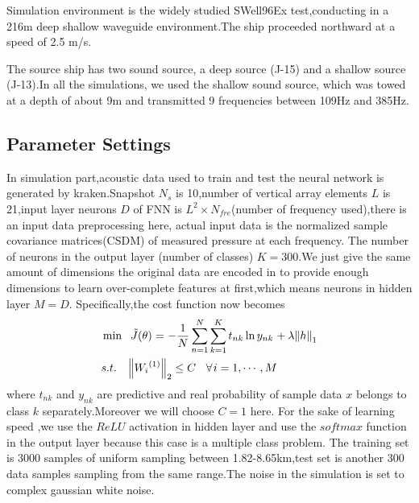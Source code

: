 Simulation environment is the widely studied SWell96Ex test,conducting in a 216m deep shallow waveguide environment.The ship proceeded northward at a speed of 2.5 m/s.

The source ship has two sound source, a deep source (J-15) and a shallow source (J-13).In all the simulations, we used the shallow sound source,
which was towed at a depth of about 9m and transmitted 9 frequencies between 109Hz and 385Hz.

\subsection{Parameter Settings}
In simulation part,acoustic data used to train and test the neural network is generated by kraken.Snapshot $N_{s}$ is 10,number of vertical array elements $L$ is 21,input layer neurons $D$ of FNN is $L^{2} \times N_{fre}$(number of frequency used),there is an input data preprocessing here, actual input data is the normalized sample covariance matrices(CSDM) of measured pressure at each frequency. The number of neurons in the output layer (number of classes) $K = 300$.We just give the same amount of dimensions the original data are encoded in to provide enough dimensions to learn over-complete features at first,which means neurons in hidden layer $M = D$. Specifically,the cost function now becomes
\begin{equation}
\begin{split}
&\min {\kern 1pt} {\kern 1pt} {\kern 1pt} {\kern 1pt} {\kern 1pt} {\kern 1pt} \tilde J(\theta ){\kern 1pt} {\kern 1pt} {\kern 1pt} {\rm{ = }}{\kern 1pt} {\kern 1pt} {\kern 1pt} {\rm{ - }}{{\rm{1}} \over N}\sum\limits_{n = 1}^N {\sum\limits_{k = 1}^K {{t_{nk}}\ln {y_{nk}}{\kern 1pt} {\kern 1pt} {\kern 1pt} {\rm{ + }}{\kern 1pt} {\kern 1pt} \lambda {{\left\| h \right\|}_1}} }\\
& s.t.{\kern 1pt} {\kern 1pt} {\kern 1pt} {\kern 1pt} {\kern 1pt} {\kern 1pt} {\kern 1pt} {\kern 1pt} {\kern 1pt} {\kern 1pt} {\left\| {{W_i}^{(1)}} \right\|_2} \le C{\kern 1pt} {\kern 1pt} {\kern 1pt} {\kern 1pt} {\kern 1pt} {\kern 1pt} {\kern 1pt} {\kern 1pt} {\kern 1pt} \forall {\kern 1pt} i = 1, \cdots ,M\\
\end{split}
\end{equation}
where $t_{nk}$ and $y_{nk}$ are predictive and real probability of sample data $x$ belongs to class $k$ separately.Moreover we will choose $C=1$ here.
For the sake of learning speed ,we use the $ReLU$ activation in hidden layer and use the $softmax$
function in the output layer because this case is a multiple class problem.
The training set is 3000 samples of uniform sampling between 1.82\--8.65km,test set is another 300 data samples sampling from the same range.The noise in the simulation is set to complex gaussian white noise.

